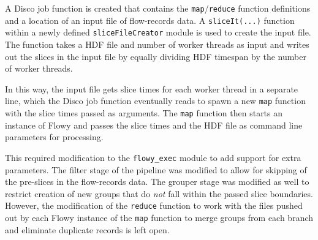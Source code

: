 A Disco job function is created that contains the \texttt{map}/\texttt{reduce}
function definitions and a location of an input file of flow-records data. A
\texttt{sliceIt(...)} function within a newly defined
\texttt{sliceFileCreator} module  is used
to create the input file. The function takes a \ac{HDF} file and number of
worker threads as input and writes out the slices in the input file by equally
dividing \ac{HDF} timespan by the number of worker threads.

In this way, the input file gets slice times for each worker thread in a
separate line, which the Disco job function eventually reads to spawn a new
\texttt{map} function with the slice times passed as arguments. The
\texttt{map} function then starts an instance of Flowy and passes the slice
times and the \ac{HDF} file as command line parameters for processing.

This required modification to the \texttt{flowy\_exec} module to add support
for extra parameters. The filter stage of the pipeline was modified to allow
for skipping of the pre-slices in the flow-records data. The grouper stage was
modified as well to restrict creation of new groups that do \emph{not} fall
within the passed slice boundaries. However, the modification of the
\texttt{reduce} function to work with the files pushed out by each Flowy
instance of the \texttt{map} function to merge groups from each branch and
eliminate duplicate records is left open.
